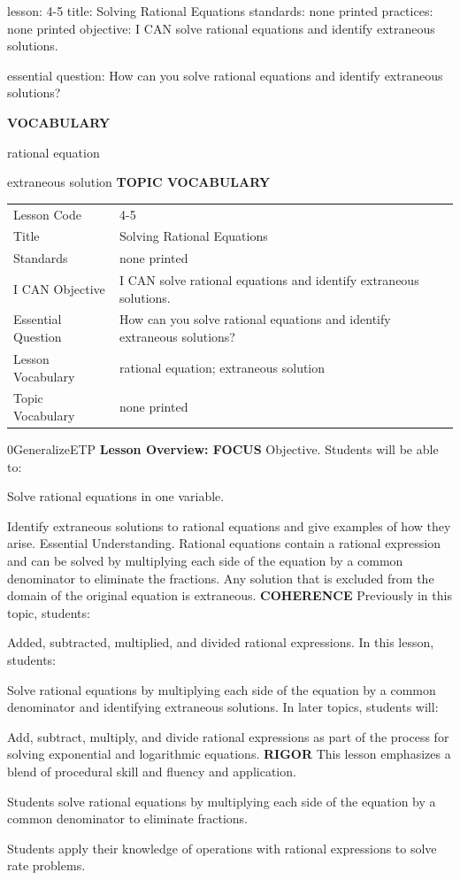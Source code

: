 \documentclass{article}
\newenvironment{lesson-meta}{}{}        %
\newenvironment{te-addendum}[2]{}{}     %
\newcommand{\te}[1]{}                   %
\begin{document}
\begin{lesson-meta}
lesson: 4-5
title: Solving Rational Equations
standards: none printed
practices: none printed
objective: I CAN solve rational equations and identify extraneous solutions.

essential question: How can you solve rational equations and identify extraneous solutions?

\textbf{VOCABULARY}
\item rational equation
\item extraneous solution
\textbf{TOPIC VOCABULARY}
\te{No topic vocabulary list is printed on these lesson pages.}
\begin{tabular}{ll}
Lesson Code & 4-5 \\
Title & Solving Rational Equations \\
Standards & none printed \\
I CAN Objective & I CAN solve rational equations and identify extraneous solutions. \\
Essential Question & How can you solve rational equations and identify extraneous solutions? \\
Lesson Vocabulary & rational equation; extraneous solution \\
Topic Vocabulary & none printed \\
\end{tabular}
\end{lesson-meta}
\begin{te-addendum}{0}{GeneralizeETP}
\textbf{Lesson Overview: FOCUS}
Objective. Students will be able to:
\item Solve rational equations in one variable.
\item Identify extraneous solutions to rational equations and give examples of how they arise.
Essential Understanding. Rational equations contain a rational expression and can be solved by multiplying each side of the equation by a common denominator to eliminate the fractions. Any solution that is excluded from the domain of the original equation is extraneous.
\textbf{COHERENCE}
Previously in this topic, students:
\item Added, subtracted, multiplied, and divided rational expressions.
In this lesson, students:
\item Solve rational equations by multiplying each side of the equation by a common denominator and identifying extraneous solutions.
In later topics, students will:
\item Add, subtract, multiply, and divide rational expressions as part of the process for solving exponential and logarithmic equations.
\textbf{RIGOR}
This lesson emphasizes a blend of procedural skill and fluency and application.
\item Students solve rational equations by multiplying each side of the equation by a common denominator to eliminate fractions.
\item Students apply their knowledge of operations with rational expressions to solve rate problems.
\end{te-addendum}
\end{document}
